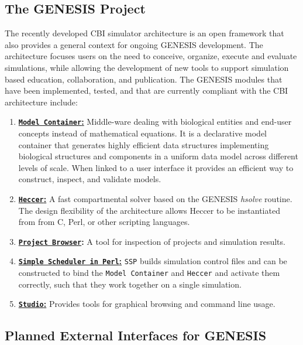 \documentclass[12pt]{article}
\begin{document}
\subsection*{The GENESIS Project}

The recently developed CBI simulator architecture is an open framework that also provides a general context for ongoing GENESIS development. The architecture focuses users on the need to conceive, organize, execute and evaluate simulations, while allowing the development of new tools to support simulation based education, collaboration, and publication. The GENESIS modules that have been implemented, tested, and that are currently compliant with the CBI architecture include:

\begin{enumerate}
\item \href{../model-container/model-container.tex}{\bf {\tt Model\,Container}:} Middle-ware dealing with biological entities and end-user concepts instead of mathematical equations. It is a declarative model container that generates highly efficient data structures implementing biological structures and components in a uniform data model across different levels of scale. When linked to a user interface it provides an efficient way to construct, inspect, and validate models.

\item \href{../heccer/heccer.tex}{\bf {\tt Heccer}:} A fast compartmental solver based on the GENESIS {\it hsolve} routine. The design flexibility of the architecture allows Heccer to be instantiated from from C, Perl, or other scripting languages.

\item {\bf \href{../project-browser/project-browser.tex}{\tt Project Browser}:} A tool for inspection of projects and simulation results.

\item \href{../ssp/ssp.tex}{\bf {\tt Simple\,Scheduler\,in\,Perl}:} {\tt SSP} builds simulation control files and can be constructed to bind the {\tt Model\,Container} and {\tt Heccer} and activate them correctly, such that they work together on a single simulation.

\item \href{../studio/studio.tex}{\bf {\tt Studio}:} Provides tools for graphical browsing and command line usage.
\end{enumerate}

\subsection*{Planned External Interfaces for GENESIS}
\end{document}
